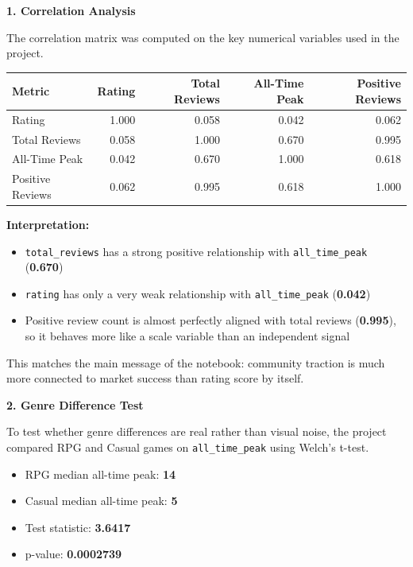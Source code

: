 \documentclass[12pt,a4paper]{report}
\begin{document}
\textbf{1. Correlation Analysis}

The correlation matrix was computed on the key numerical variables used in the project.

\begin{center}
\begin{tabular}{lrrrr}
\toprule
\textbf{Metric} & \textbf{Rating} & \textbf{Total Reviews} & \textbf{All-Time Peak} & \textbf{Positive Reviews} \\
\midrule
Rating & 1.000 & 0.058 & 0.042 & 0.062 \\
Total Reviews & 0.058 & 1.000 & 0.670 & 0.995 \\
All-Time Peak & 0.042 & 0.670 & 1.000 & 0.618 \\
Positive Reviews & 0.062 & 0.995 & 0.618 & 1.000 \\
\bottomrule
\end{tabular}
\end{center}

\textbf{Interpretation:}
\begin{itemize}
\item \texttt{total\_reviews} has a strong positive relationship with \texttt{all\_time\_peak} (\textbf{0.670})
\item \texttt{rating} has only a very weak relationship with \texttt{all\_time\_peak} (\textbf{0.042})
\item Positive review count is almost perfectly aligned with total reviews (\textbf{0.995}), so it behaves more like a scale variable than an independent signal
\end{itemize}

This matches the main message of the notebook: community traction is much more connected to market success than rating score by itself.

\textbf{2. Genre Difference Test}

To test whether genre differences are real rather than visual noise, the project compared RPG and Casual games on \texttt{all\_time\_peak} using Welch's t-test.

\begin{itemize}
\item RPG median all-time peak: \textbf{14}
\item Casual median all-time peak: \textbf{5}
\item Test statistic: \textbf{3.6417}
\item p-value: \textbf{0.0002739}
\end{itemize}
\end{document}
